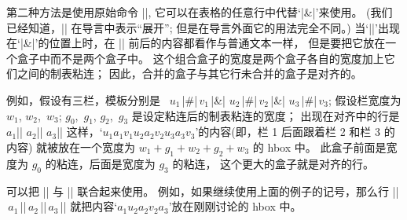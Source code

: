 {{%
\ddanger 第二种方法是使用原始命令 |\span|, 它可以在表格的任意行中代替`|&|'来使用。%
(我们已经知道，|\span| 在导言中表示``展开'';
但是在导言外面它的用法完全不同。)
当`|\span|'出现在`|&|'的位置上时，在 |\span| 前后的内容都看作与普通文本一样，
但是要把它放在一个盒子中而不是两个盒子中。%
这个组合盒子的宽度是两个盒子各自的宽度加上它们之间的制表粘连；
因此，合并的盒子与其它行未合并的盒子是对齐的。

\ddanger 例如，假设有三栏，模板分别是%
~$u_1\,$|#|$\,v_1\,$|&| $u_2\,$|#|$\,v_2\,$|&|
$u_3\,$|#|$\,v_3$; 假设栏宽度为 $w_1$, $w_2$,~$w_3$;
$g_0$,~$g_1$, $g_2$,~$g_3$ 是设定粘连后的制表粘连的宽度；
出现在对齐中的行是
\begindisplay
$a_1$|\span|$\,\,a_2$|\span|$\,\,a_3$|\cr|
\enddisplay
这样，`$u_1a_1v_1u_2a_2v_2u_3a_3v_3$'的内容(即，栏 1 后面跟着栏 2 和栏 3 的内容)%
就被放在一个宽度为 $w_1+g_1+ w_2+g_2+w_3$ 的 hbox 中。%
此盒子前面是宽度为 $g_0$ 的粘连，后面是宽度为 $g_3$ 的粘连，
这个更大的盒子就是对齐的行。

\ddanger 可以把 |\omit| 与 |\span| 联合起来使用。%
例如，如果继续使用上面的例子的记号，那么行
\begindisplay
|\omit|$\,a_1\,$|\span|$\,a_2\,$|\span\omit|$\,a_3\,$|\cr|
\enddisplay
就把内容`$a_1u_2a_2v_2a_3$'放在刚刚讨论的 hbox 中。

}}
